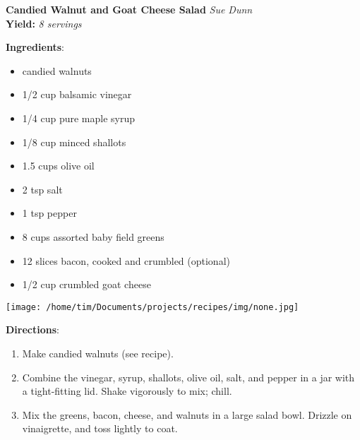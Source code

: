 \documentclass[11pt, twoside, openany]{book}
\begin{document}
\noindent\begin{minipage}[t]{\linewidth}%
{\Large\textbf{Candied Walnut and Goat Cheese Salad}} \label{candied-walnut-and-goat-cheese-salad}\hfill\textit{Sue Dunn}\\
\textbf{Yield:} \textit{8 servings}\\
\noindent\begin{minipage}[t]{0.78\linewidth}%
\textbf{Ingredients}:\vspace{-3mm}
\begin{multicols}{2}
\begin{itemize}\setlength\itemsep{-1mm}
\item candied walnuts
\item 1/2 cup balsamic vinegar
\item 1/4 cup pure maple syrup
\item 1/8 cup minced shallots
\item 1.5 cups olive oil
\item 2 tsp salt
\item 1 tsp pepper
\item 8 cups assorted baby field greens
\item 12 slices bacon, cooked and crumbled (optional)
\item 1/2 cup crumbled goat cheese
\end{itemize}
\end{multicols}
\end{minipage}
\noindent\begin{minipage}[t]{0.18\linewidth}
\centering \strut\vspace*{-\baselineskip}\newline
\texttt{[image: /home/tim/Documents/projects/recipes/img/none.jpg]}\\
\end{minipage}\vspace{3mm}
\textbf{Directions}:
\vspace{-3mm}\begin{enumerate}\setlength\itemsep{-1mm}
\item Make candied walnuts (see recipe).
\item Combine the vinegar, syrup, shallots, olive oil, salt, and pepper in a jar with a tight-fitting lid. Shake vigorously to mix; chill.
\item Mix the greens, bacon, cheese, and walnuts in a large salad bowl. Drizzle on vinaigrette, and toss lightly to coat.
\end{enumerate}
\end{minipage}\vspace{8mm}
\end{document}

